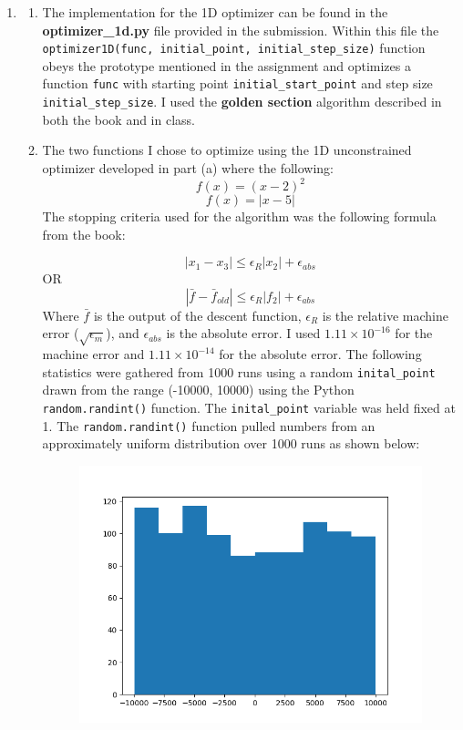 \documentclass[11pt]{article}
\begin{document}
\begin{enumerate}
\item
\begin{enumerate}
\item The implementation for the 1D optimizer can be found in the {\bf optimizer\_1d.py} file provided in the submission. Within this file the \texttt{optimizer1D(func, initial\_point, initial\_step\_size)} function obeys the prototype mentioned in the assignment and optimizes a function \texttt{func} with starting point \texttt{initial\_start\_point} and step size \texttt{initial\_step\_size}. I used the {\bf golden section} algorithm described in both the book and in class.
\item The two functions I chose to optimize using the 1D unconstrained optimizer developed in part (a) where the following:
\[f(x) = (x - 2)^2 \]
\[f(x) = |x - 5|\]
The stopping criteria used for the algorithm was the following formula from the book:

$$  |x_{1} - x_{3}| \le \epsilon_{R}|x_{2}| + \epsilon_{abs} $$
\centering
OR
$$ |\bar{f} - \bar{f}_{old} | \le \epsilon_{R} |f_{2}| + \epsilon_{abs} $$
\flushleft
Where $\bar{f}$ is the output of the descent function, $\epsilon_{R}$ is the relative machine error ($\sqrt{\epsilon_{m}}$), and $\epsilon_{abs}$ is the absolute error. I used $1.11 \times 10^{-16}$ for the machine error and $1.11 \times 10^{-14}$ for the absolute error.
The following statistics were gathered from 1000 runs using a random \texttt{inital\_point} drawn from the range (-10000, 10000) using the Python \texttt{random.randint()} function. The \texttt{inital\_point} variable was held fixed at 1. The \texttt{random.randint()} function pulled numbers from an approximately uniform distribution over 1000 runs as shown below: \\
\begin{figure}[h]

	\centering
	\includegraphics[width=10cm]{report_images/start_point}
	\label{fig:rand_distribution}
	

\end{figure}
\end{enumerate}
\end{enumerate}
\end{document}
